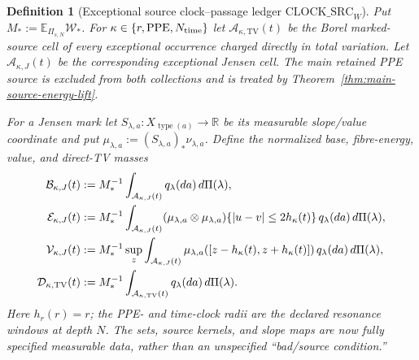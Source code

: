 \documentclass[11pt]{article}
\newtheorem{definition}[theorem]{Definition}
\begin{document}
\begin{definition}[Exceptional source clock--passage ledger
$\mathrm{CLOCK\_SRC}_{W}$]
\label{def:source-clock-matrix}
Put $M_*:=\mathbb E_{\Pi_{s,N}}\mathscr W_*$.  For
$\kappa\in\{r,\mathrm{PPE},N_{\rm time}\}$ let
$\mathcal A_{\kappa,\mathrm{TV}}(t)$ be the Borel marked-source cell of every
\emph{exceptional} occurrence charged directly in total variation.  Let
$\mathcal A_{\kappa,J}(t)$ be the corresponding exceptional Jensen cell.
The main retained PPE source is excluded from both collections and is treated
by Theorem~\ref{thm:main-source-energy-lift}.

For a Jensen mark let $S_{\lambda,a}:X_{\operatorname{type}(a)}\to\mathbb R$
be its measurable slope/value coordinate and put
$\mu_{\lambda,a}:=(S_{\lambda,a})_*\nu_{\lambda,a}$.  Define the normalized
base, fibre-energy, value, and direct-TV masses
\begin{align}
 \mathcal B_{\kappa,J}(t)&:=M_*^{-1}
  \int_{\mathcal A_{\kappa,J}(t)}q_\lambda(da)\,d\Pi(\lambda),\notag\\
 \mathcal E_{\kappa,J}(t)&:=M_*^{-1}
  \int_{\mathcal A_{\kappa,J}(t)}
  (\mu_{\lambda,a}\otimes\mu_{\lambda,a})
  \{|u-v|\le2h_\kappa(t)\}\,q_\lambda(da)\,d\Pi(\lambda),\notag\\
 \mathcal V_{\kappa,J}(t)&:=M_*^{-1}\sup_z
  \int_{\mathcal A_{\kappa,J}(t)}
  \mu_{\lambda,a}([z-h_\kappa(t),z+h_\kappa(t)])
  \,q_\lambda(da)\,d\Pi(\lambda),\notag\\
 \mathcal D_{\kappa,\mathrm{TV}}(t)&:=M_*^{-1}
  \int_{\mathcal A_{\kappa,\mathrm{TV}}(t)}
       q_\lambda(da)\,d\Pi(\lambda).
 \label{eq:clock-source-partition}
\end{align}
Here $h_r(r)=r$; the PPE- and time-clock radii are the declared resonance
windows at depth $N$.  The sets, source kernels, and slope maps are now
fully specified measurable data, rather than an unspecified ``bad/source
condition.''


\end{definition}
\end{document}
